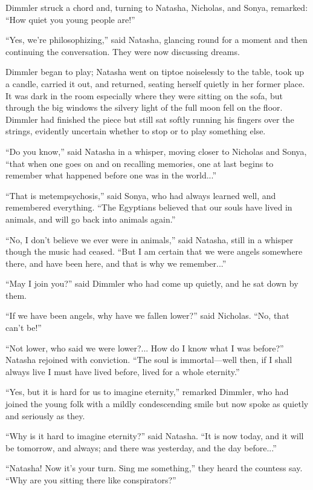 Dimmler struck a chord and, turning to Natasha, Nicholas, and
Sonya, remarked: ``How quiet you young people are!''

``Yes, we're philosophizing,'' said Natasha, glancing round for a
moment and then continuing the conversation. They were now
discussing dreams.

Dimmler began to play; Natasha went on tiptoe noiselessly to the
table, took up a candle, carried it out, and returned, seating
herself quietly in her former place. It was dark in the room
especially where they were sitting on the sofa, but through the
big windows the silvery light of the full moon fell on the
floor. Dimmler had finished the piece but still sat softly
running his fingers over the strings, evidently uncertain whether
to stop or to play something else.

``Do you know,'' said Natasha in a whisper, moving closer to
Nicholas and Sonya, ``that when one goes on and on recalling
memories, one at last begins to remember what happened before one
was in the world...''

``That is metempsychosis,'' said Sonya, who had always learned
well, and remembered everything. ``The Egyptians believed that
our souls have lived in animals, and will go back into animals
again.''

``No, I don't believe we ever were in animals,'' said Natasha,
still in a whisper though the music had ceased. ``But I am
certain that we were angels somewhere there, and have been here,
and that is why we remember...''

``May I join you?'' said Dimmler who had come up quietly, and he
sat down by them.

``If we have been angels, why have we fallen lower?'' said
Nicholas. ``No, that can't be!''

``Not lower, who said we were lower?... How do I know what I was
before?''  Natasha rejoined with conviction. ``The soul is
immortal---well then, if I shall always live I must have lived
before, lived for a whole eternity.''

``Yes, but it is hard for us to imagine eternity,'' remarked
Dimmler, who had joined the young folk with a mildly
condescending smile but now spoke as quietly and seriously as
they.

``Why is it hard to imagine eternity?'' said Natasha. ``It is now
today, and it will be tomorrow, and always; and there was
yesterday, and the day before...''

``Natasha! Now it's your turn. Sing me something,'' they heard
the countess say. ``Why are you sitting there like
conspirators?''

